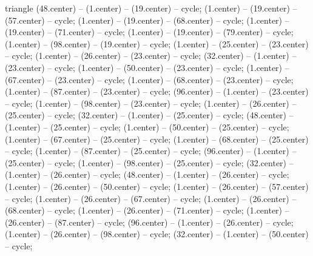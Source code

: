 \begin{pgfonlayer}{triangle}
 (48.center) -- (1.center) -- (19.center) -- cycle; 
 (1.center) -- (19.center) -- (57.center) -- cycle; 
 (1.center) -- (19.center) -- (68.center) -- cycle; 
 (1.center) -- (19.center) -- (71.center) -- cycle; 
 (1.center) -- (19.center) -- (79.center) -- cycle; 
 (1.center) -- (98.center) -- (19.center) -- cycle; 
 (1.center) -- (25.center) -- (23.center) -- cycle; 
 (1.center) -- (26.center) -- (23.center) -- cycle; 
 (32.center) -- (1.center) -- (23.center) -- cycle; 
 (1.center) -- (50.center) -- (23.center) -- cycle; 
 (1.center) -- (67.center) -- (23.center) -- cycle; 
 (1.center) -- (68.center) -- (23.center) -- cycle; 
 (1.center) -- (87.center) -- (23.center) -- cycle; 
 (96.center) -- (1.center) -- (23.center) -- cycle; 
 (1.center) -- (98.center) -- (23.center) -- cycle; 
 (1.center) -- (26.center) -- (25.center) -- cycle; 
 (32.center) -- (1.center) -- (25.center) -- cycle; 
 (48.center) -- (1.center) -- (25.center) -- cycle; 
 (1.center) -- (50.center) -- (25.center) -- cycle; 
 (1.center) -- (67.center) -- (25.center) -- cycle; 
 (1.center) -- (68.center) -- (25.center) -- cycle; 
 (1.center) -- (87.center) -- (25.center) -- cycle; 
 (96.center) -- (1.center) -- (25.center) -- cycle; 
 (1.center) -- (98.center) -- (25.center) -- cycle; 
 (32.center) -- (1.center) -- (26.center) -- cycle; 
 (48.center) -- (1.center) -- (26.center) -- cycle; 
 (1.center) -- (26.center) -- (50.center) -- cycle; 
 (1.center) -- (26.center) -- (57.center) -- cycle; 
 (1.center) -- (26.center) -- (67.center) -- cycle; 
 (1.center) -- (26.center) -- (68.center) -- cycle; 
 (1.center) -- (26.center) -- (71.center) -- cycle; 
 (1.center) -- (26.center) -- (87.center) -- cycle; 
 (96.center) -- (1.center) -- (26.center) -- cycle; 
 (1.center) -- (26.center) -- (98.center) -- cycle; 
 (32.center) -- (1.center) -- (50.center) -- cycle; 

\end{pgfonlayer}
